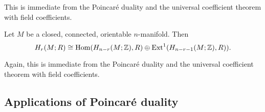This is immediate from the Poincar\'e duality and the universal coefficient theorem with field coefficients.

\begin{corollary}
    Let $M$ be a closed, connected, orientable $n$-manifold. Then
    \[ H_r(M; R) \cong \operatorname{Hom}(H_{n-r}(M; \mathbb Z), R) \oplus \operatorname{Ext}^1(H_{n-r-1}(M; \mathbb Z), R)). \]
\end{corollary}

Again, this is immediate from the Poincar\'e duality and the universal coefficient theorem with field coefficients.

\subsection{Applications of Poincar\'e duality}

